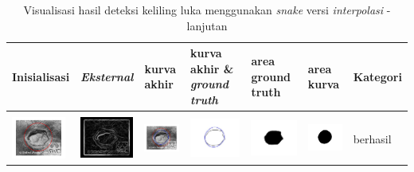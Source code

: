 \begin{table}[H]
	\centering
	\caption{Visualisasi hasil deteksi keliling luka menggunakan \emph{snake} versi \emph{interpolasi} - lanjutan}
	\label{tabel_hasil_6_interp}
	\begin{tabular}{|m{0.7in}|m{0.7in}|m{0.7in}|m{0.7in}|m{0.7in}|m{0.7in}|m{0.7in}|}
		\hline
		\textbf{Inisialisasi} & \textbf{\emph{Eksternal}} & \textbf{kurva akhir} & \textbf{kurva akhir \& \emph{ground truth}}& \textbf{area ground truth} & \textbf{area kurva} & \textbf{Kategori} \\
		\hline
		
		&  &  & & & &  \\
		\includegraphics[width=0.7in]{dataset/dataset_3/luka_kuning/ready/34_interp_init.jpg}&
		\includegraphics[width=0.7in]{dataset/dataset_3/luka_kuning/ready/34_interp_ext.jpg}&
		\includegraphics[width=0.7in]{dataset/dataset_3/luka_kuning/ready/34_interp_result.jpg}&
		\includegraphics[width=0.7in]{dataset/dataset_3/luka_kuning/ready/34_gt_r.jpg}&
		\includegraphics[width=0.7in]{dataset/dataset_3/luka_kuning/ready/34_r.jpg}&
		\includegraphics[width=0.7in]{dataset/dataset_3/luka_kuning/ready/34_interp_r.jpg}&
		berhasil\\
		\hline
		

\end{tabular}
\end{table}
